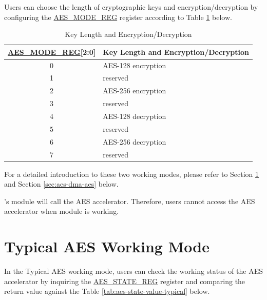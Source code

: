 \documentclass[main\_\_EN.tex]{subfiles}
\begin{document}
Users can choose the length of cryptographic keys and encryption/decryption by configuring the \hyperref[regdesc:AESMODEREG]{AES\_MODE\_REG} register according to Table \ref{tab:aes-operation} below.

\begin{longtable}[c]{ | c | l | }
\caption{Key Length and Encryption/Decryption}
\label{tab:aes-operation}
\\\hline
\rowcolor{lightgray}
\textbf{\hyperref[regdesc:AESMODEREG]{AES\_MODE\_REG}[2:0] }    & \textbf{Key Length and Encryption/Decryption}\\
    \hline
    0                   & AES-128 encryption    \\
    \hline
    1                   & reserved    \\
    \hline
    2                   & AES-256 encryption    \\
    \hline
    3                   & reserved    \\
    \hline
    4                   & AES-128 decryption    \\
    \hline
    5                   & reserved    \\
    \hline
    6                   & AES-256 decryption    \\
    \hline
    7                   & reserved    \\
    \hline
\end{longtable}
For a detailed introduction to these two working modes, please refer to Section \ref{sec:aes-typical-modes} and Section \ref{sec:aes-dma-aes} below.
\begin{importantlisting}
\vspace{-0.5em}

    \chipname{}'s  module will call the AES accelerator. Therefore, users cannot access the AES accelerator when  module is working.
\end{importantlisting}



\section{Typical AES Working Mode}\label{sec:aes-typical-modes}

In the Typical AES working mode,
users can check the working status of the AES accelerator by inquiring the \hyperref[regdesc:AESSTATEREG]{AES\_STATE\_REG} register and comparing the return value against the Table \ref{tab:aes-state-value-typical} below.
\end{document}
